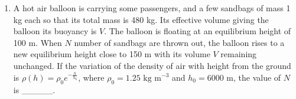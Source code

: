 
\begin{enumerate}
    \item A hot air balloon is carrying some passengers, and a few sandbags of mass 1 kg each so that its total mass is 480 kg. Its effective volume giving the balloon its buoyancy is \( V \). The balloon is floating at an equilibrium height of 100 m. When \( N \) number of sandbags are thrown out, the balloon rises to a new equilibrium height close to 150 m with its volume \( V \) remaining unchanged. If the variation of the density of air with height from the ground is \( \rho(h) = \rho_0 e^{-\frac{h}{h_0}} \), where \( \rho_0 = 1.25 \text{ kg m}^{-3} \) and \( h_0 = 6000 \text{ m} \), the value of \( N \) is \_\_\_\_\_.
\end{enumerate}

